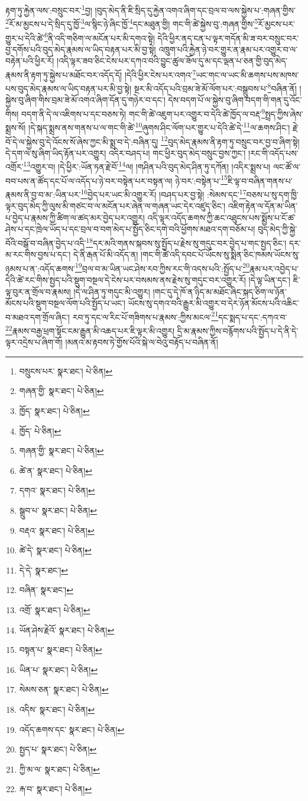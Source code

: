 རྟག་ཏུ་རྐྱེན་ལས་:བསྲུང་བར་\footnote{བསྲུངས་པར་  སྣར་ཐང་།  པེ་ཅིན། }བྱ། །བུད་མེད་ནི་ཇི་སྲིད་དུ་རྐྱེན་འགའ་ཞིག་དང་བྲལ་བ་ལས་སྐྱེས་པ་:གཞན་གྱིས་\footnote{གཞན་གྱི་  སྣར་ཐང་།  པེ་ཅིན། }རོ་མ་མྱངས་པ་དེ་སྲིད་དུ་ཁྱོ་\footnote{ཁྱོད་  སྣར་ཐང་།  པེ་ཅིན། }ལ་སྙིང་ཉེ་ཞིང་ཁྱོ་\footnote{ཁྱོད་  པེ་ཅིན། }དང་མཐུན་གྱི། གང་གི་ཚེ་སྐྱེས་བུ་:གཞན་གྱིས་\footnote{གཞན་གྱི་  སྣར་ཐང་།  པེ་ཅིན། }རོ་མྱངས་པར་གྱུར་པ་དེའི་ཚེ་\footnote{ཚེ་ན་  སྣར་ཐང་།  པེ་ཅིན། }ནི་འདི་གཅིག་ལ་མངོན་པར་མི་དགའ་སྟེ། དེའི་ཕྱིར་ནད་ངན་པ་ལྟར་གདོན་མི་ཟ་བར་བསྲུང་བར་བྱ་དགོས་པའི་བུད་མེད་རྣམས་ལ་ཡིད་བརྟན་པར་མི་བྱ་སྟེ། འཁྲུག་པའི་རྐྱེན་ཉེ་བར་གྱུར་ན་རྣམ་པར་འགྱུར་བ་ལ་བརྟེན་པའི་ཕྱིར་རོ། །འདི་ལྟར་ཟབ་ཅིང་ངེས་པར་དཀའ་བའི་བྱུང་ཚུལ་ཟོལ་དུ་མ་དང་ལྡན་པ་ཅན་གྱི་བུད་མེད་རྣམས་ནི་རྟག་ཏུ་སྐྱེས་པ་མཐོང་བར་འདོད་དོ། །དེའི་ཕྱིར་ངེས་པར་འགའ་\footnote{དགའ་  སྣར་ཐང་།  པེ་ཅིན། }ཡང་གང་ལ་ཡང་མི་ཆགས་པས་མཁས་པས་བུད་མེད་རྣམས་ལ་ཡིད་བརྟན་པར་མི་བྱ་སྟེ། སྔར་མི་འདོད་པའི་བྲམ་ཟེ་མོ་ལོག་པར་:བསྒྲུབས་པ་\footnote{སྒྲུབ་པ་  སྣར་ཐང་།  པེ་ཅིན། }བཞིན་ནོ། །སྐྱེས་བུ་ཞིག་གིས་བྲམ་ཟེ་མོ་འགའ་ཞིག་དོན་དུ་གཉེར་བ་དང་། དེས་བདག་པོ་ལ་སྐྱེས་བུ་ཞིག་བདག་གི་གན་དུ་འོང་གིས། བདག་ནི་དེ་ལ་འཇིགས་པ་དང་བཅས་ཏེ། གང་གི་ཚེ་འཇུག་པར་འགྱུར་བ་དེའི་ཚེ་ཁྱོད་ལ་བརྡ་\footnote{བརྡའ་  སྣར་ཐང་།  པེ་ཅིན། }སྤྲད་ཀྱིས་ཞེས་སྨྲས་སོ། །དེ་སྐད་སྨྲས་ནས་གནས་པ་ལ་གང་གི་ཚེ་\footnote{ཚེ་དེ་  སྣར་ཐང་།  པེ་ཅིན། }ཞུགས་ཤིང་ལོག་པར་གྱུར་པ་དེའི་ཚེ་དེ་\footnote{དེ་དེ་  སྣར་ཐང་། }ལ་ཆགས་ཤིང་། རྗེ་བོ་དེ་ལ་སྐྱེས་བུ་དེ་འོངས་སོ་ཞེས་ཀྱང་མི་སྨྲ་བ་དེ་:བཞིན་དུ། \footnote{བཞིན་  སྣར་ཐང་། }བུད་མེད་རྣམས་ནི་རྟག་ཏུ་བསྲུང་བར་བྱ་བ་ཞིག་སྟེ། དེ་དག་ལ་སུ་ཞིག་ཡིད་རྟོན་པར་འགྱུར། འདིར་བཤད་པ། གང་ཕྱིར་བུད་མེད་བསྲུང་བྱས་ཀྱང་། །རང་གི་འདོད་པས་འགྲོར་\footnote{འགྲོ་  སྣར་ཐང་།  པེ་ཅིན། }འགྱུར་བ། །དེ་ཕྱིར་:ཡོན་ཏན་རྗེ་བོ་\footnote{ཡོན་ཤེས་རྗེའོ་  སྣར་ཐང་།  པེ་ཅིན། }ལ། །གཤིན་པའི་བུད་མེད་ཤིན་ཏུ་དཀོན། །འདིར་སྨྲས་པ། ལང་ཚོ་ལ་བབ་པས་ན་ཚོད་དང་པོ་ལ་འདོད་པ་ཉེ་བར་བསྟེན་པར་བསྟན་ལ། ཉེ་བར་:བསྟེན་པ་\footnote{བསྟན་པ་  སྣར་ཐང་།  པེ་ཅིན། }ཇི་ལྟ་བ་བཞིན་གནས་པ་རྣམས་ནི་བྱ་བ་མ་:ཡིན་པར་\footnote{ཡིན་པ་  སྣར་ཐང་།  པེ་ཅིན། }བྱེད་པར་ཡང་མི་འགྱུར་རོ། །བཤད་པར་བྱ་སྟེ། :སེམས་དང་\footnote{སེམས་ཅན་  སྣར་ཐང་།  པེ་ཅིན། }བཅས་པ་སུ་དག་ཁྱི་ལྟར་བུད་མེད་ཀྱི་ལུས་མི་གཙང་བ་ལ་མངོན་པར་ཞེན་ལ་གཞན་ཡང་དེར་འཛུད་ཅིང་། འཇིག་རྟེན་ལ་དོན་མ་ཡིན་པ་བྱེད་པ་རྣམས་ཀྱི་ཚིག་ལ་ཚད་མར་བྱེད་པར་འགྱུར། འདི་ལྟར་འདོད་ཆགས་ཀྱི་ཆང་འཐུངས་པས་སྨྱོས་པ་ངོ་ཚ་ཤེས་པ་དང་ཁྲེལ་ཡོད་པ་དང་བྲལ་བ་བག་མེད་པ་སྤྱོད་ཅིང་དགེ་བའི་ཕྱོགས་མཐའ་དག་བཅོམ་པ། བུད་མེད་ཀྱི་སྐྱེ་བོའི་བསྒོ་བ་བཞིན་བྱེད་པ་འདི་\footnote{འདིས་  སྣར་ཐང་།  པེ་ཅིན། }དར་མའི་གནས་སྐབས་སུ་སྤྱོད་པ་རྗེས་སུ་གདུང་བར་བྱེད་པ་གང་སྤྱད་ཅིང་། དར་མ་རང་གིས་བྱས་པ་དང་། དེ་ནི་རྒན་པོ་མི་འདོད་ན། །གང་གི་ཚེ་འདི་དབང་པོ་ཡོངས་སུ་སྨིན་ཅིང་ཁམས་ཡོངས་སུ་ཉམས་པ་ན་:འདོད་ཆགས་\footnote{འདོད་ཆགས་དང་  སྣར་ཐང་།  པེ་ཅིན། }བྲལ་བ་མ་ཡིན་ཡང་ཤེས་རབ་ཀྱིས་རང་གི་འདས་པའི་:སྤྱོད་པ་\footnote{སྤྱད་པ་  སྣར་ཐང་།  པེ་ཅིན། }རྣམ་པར་འབྱེད་པ་དེའི་ཚེ་རང་གིས་སྤྱད་པའི་སྡུག་བསྔལ་དེ་ངེས་པར་བསམས་ནས་རྗེས་སུ་གདུང་བར་འགྱུར་རོ། །དེ་ལྟ་ཡིན་དང་། ཇི་ལྟ་བུར་ན་གྲོལ་བ་རྣམས། །དེ་ལ་ཤིན་ཏུ་གདུང་མི་འགྱུར། །གང་དུ་དེ་ཁོ་ན་ཉིད་མ་མཐོང་ཞིང་སྐད་ཅིག་ལ་ཉོན་མོངས་པའི་སྡུག་བསྔལ་ལོག་པའི་སྤྱོད་པ་ཡང་། ཡོངས་སུ་དགའ་བའི་རྒྱུར་མི་འགྱུར་བ་དེར་ཉོན་མོངས་པའི་འཆིང་བ་མཐའ་དག་གྲོལ་ཞིང་། རབ་ཏུ་དང་ལ་རིང་པོ་གཟིགས་པ་རྣམས་:ཀྱིས་མངལ་\footnote{ཀྱི་མ་ལ་  སྣར་ཐང་།  པེ་ཅིན། }དང་སྨད་པ་དང་:དཀའ་བ་\footnote{རྐ་བ་  སྣར་ཐང་།  པེ་ཅིན། }རྣམས་བརྒྱ་ཕྲག་སྟོང་ངམ་རྒྱུན་མི་འཆད་པར་ཇི་ལྟར་མི་འགྱུར། དྲི་མ་རྣམས་ཀྱིས་བརྙོགས་པའི་སྤྱོད་པ་དེ་ནི་དེ་ལྟར་འདྲེས་པ་ཞིག་གོ། །མནའ་མ་རྟབས་ཏེ་གྱོས་པོའི་སྐེ་ལ་བེའུ་བརྟོད་པ་བཞིན་ནོ། 